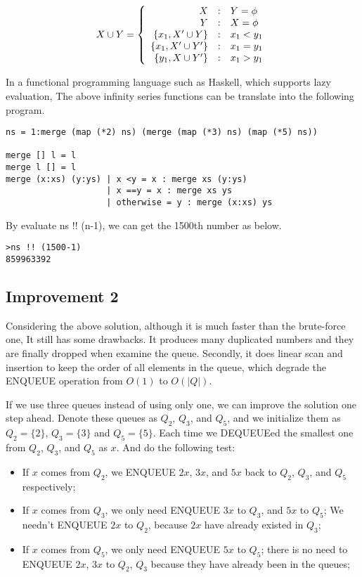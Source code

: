 \documentclass{article}
\begin{document}
\[
X \cup Y = \left \{
  \begin{array}{r@{\quad:\quad}l}
  X & Y = \phi \\
  Y & X = \phi \\
  \{ x_1, X' \cup Y \} & x_1 < y_1 \\
  \{ x_1, X' \cup Y' \} & x_1 = y_1 \\
  \{ y_1, X \cup Y' \} & x_1 > y_1
  \end{array}
\right.
\]

In a functional programming language such as Haskell, which supports
lazy evaluation, The above infinity series functions can be translate
into the following program.

\lstset{language=Haskell}
\begin{lstlisting}
ns = 1:merge (map (*2) ns) (merge (map (*3) ns) (map (*5) ns))

merge [] l = l
merge l [] = l
merge (x:xs) (y:ys) | x <y = x : merge xs (y:ys)
                    | x ==y = x : merge xs ys
                    | otherwise = y : merge (x:xs) ys
\end{lstlisting}

By evaluate ns !! (n-1), we can get the 1500th number as
below.

\begin{verbatim}
>ns !! (1500-1)
859963392
\end{verbatim}

\subsection{Improvement 2}
Considering the above solution, although it is much faster than the brute-force one,
It still has some drawbacks. It produces many duplicated numbers and they are
finally dropped when examine the queue. Secondly, it does linear scan and insertion
to keep the order of all elements in the queue, which degrade the ENQUEUE operation
from $O(1)$ to $O(|Q|)$.

If we use three queues instead of using only one, we can improve the solution one
step ahead. Denote these queues as $Q_2$, $Q_3$, and $Q_5$, and we initialize
them as $Q_2=\{ 2 \}$, $Q_3 = \{ 3\}$ and $Q_5 = \{ 5 \}$. Each time we DEQUEUEed
the smallest one from $Q_2$, $Q_3$, and $Q_5$ as $x$. And do the following test:

\begin{itemize}
\item If $x$ comes from $Q_2$, we ENQUEUE $2x$, $3x$, and $5x$ back to
$Q_2$, $Q_3$, and $Q_5$ respectively;
\item If $x$ comes from $Q_3$, we only need ENQUEUE $3x$ to $Q_3$, and $5x$ to $Q_5$;
We needn't ENQUEUE $2x$ to $Q_2$, because $2x$ have already existed in $Q_3$;
\item If $x$ comes from $Q_5$, we only need ENQUEUE $5x$ to $Q_5$; there is
no need to ENQUEUE $2x$, $3x$ to $Q_2$, $Q_3$ because they have already been
in the queues;
\end{itemize}
\end{document}
